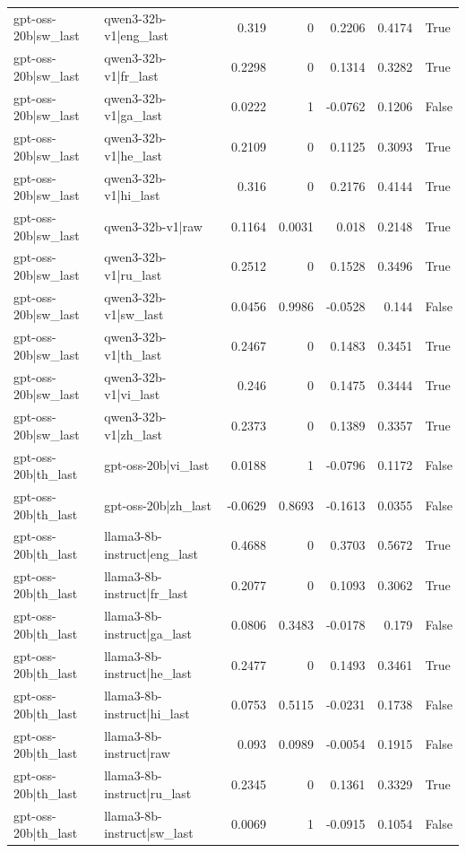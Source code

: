 \begin{table}
\begin{tabular}{l l r r r r l}
gpt-oss-20b|sw_last & qwen3-32b-v1|eng_last & 0.319 & 0 & 0.2206 & 0.4174 & True \\
gpt-oss-20b|sw_last & qwen3-32b-v1|fr_last & 0.2298 & 0 & 0.1314 & 0.3282 & True \\
gpt-oss-20b|sw_last & qwen3-32b-v1|ga_last & 0.0222 & 1 & -0.0762 & 0.1206 & False \\
gpt-oss-20b|sw_last & qwen3-32b-v1|he_last & 0.2109 & 0 & 0.1125 & 0.3093 & True \\
gpt-oss-20b|sw_last & qwen3-32b-v1|hi_last & 0.316 & 0 & 0.2176 & 0.4144 & True \\
gpt-oss-20b|sw_last & qwen3-32b-v1|raw & 0.1164 & 0.0031 & 0.018 & 0.2148 & True \\
gpt-oss-20b|sw_last & qwen3-32b-v1|ru_last & 0.2512 & 0 & 0.1528 & 0.3496 & True \\
gpt-oss-20b|sw_last & qwen3-32b-v1|sw_last & 0.0456 & 0.9986 & -0.0528 & 0.144 & False \\
gpt-oss-20b|sw_last & qwen3-32b-v1|th_last & 0.2467 & 0 & 0.1483 & 0.3451 & True \\
gpt-oss-20b|sw_last & qwen3-32b-v1|vi_last & 0.246 & 0 & 0.1475 & 0.3444 & True \\
gpt-oss-20b|sw_last & qwen3-32b-v1|zh_last & 0.2373 & 0 & 0.1389 & 0.3357 & True \\
gpt-oss-20b|th_last & gpt-oss-20b|vi_last & 0.0188 & 1 & -0.0796 & 0.1172 & False \\
gpt-oss-20b|th_last & gpt-oss-20b|zh_last & -0.0629 & 0.8693 & -0.1613 & 0.0355 & False \\
gpt-oss-20b|th_last & llama3-8b-instruct|eng_last & 0.4688 & 0 & 0.3703 & 0.5672 & True \\
gpt-oss-20b|th_last & llama3-8b-instruct|fr_last & 0.2077 & 0 & 0.1093 & 0.3062 & True \\
gpt-oss-20b|th_last & llama3-8b-instruct|ga_last & 0.0806 & 0.3483 & -0.0178 & 0.179 & False \\
gpt-oss-20b|th_last & llama3-8b-instruct|he_last & 0.2477 & 0 & 0.1493 & 0.3461 & True \\
gpt-oss-20b|th_last & llama3-8b-instruct|hi_last & 0.0753 & 0.5115 & -0.0231 & 0.1738 & False \\
gpt-oss-20b|th_last & llama3-8b-instruct|raw & 0.093 & 0.0989 & -0.0054 & 0.1915 & False \\
gpt-oss-20b|th_last & llama3-8b-instruct|ru_last & 0.2345 & 0 & 0.1361 & 0.3329 & True \\
gpt-oss-20b|th_last & llama3-8b-instruct|sw_last & 0.0069 & 1 & -0.0915 & 0.1054 & False \\

\end{tabular}
\end{table}
